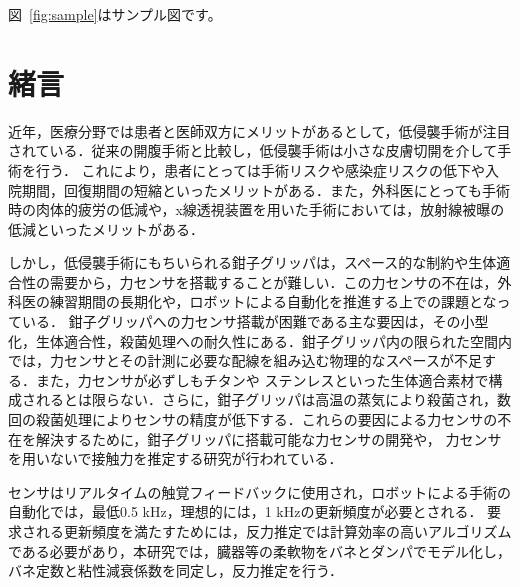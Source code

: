 \documentclass[a4paper]{jarticle}
\begin{document}
図~\ref{fig:sample}はサンプル図です。
\fi

\section{緒言}
近年，医療分野では患者と医師双方にメリットがあるとして，低侵襲手術が注目されている．従来の開腹手術と比較し，低侵襲手術は小さな皮膚切開を介して手術を行う．
これにより，患者にとっては手術リスクや感染症リスクの低下や入院期間，回復期間の短縮といったメリットがある．また，外科医にとっても手術時の肉体的疲労の低減や，x線透視装置を用いた手術においては，放射線被曝の低減といったメリットがある．

しかし，低侵襲手術にもちいられる鉗子グリッパは，スペース的な制約や生体適合性の需要から，力センサを搭載することが難しい．この力センサの不在は，外科医の練習期間の長期化や，ロボットによる自動化を推進する上での課題となっている．
鉗子グリッパへの力センサ搭載が困難である主な要因は，その小型化，生体適合性，殺菌処理への耐久性にある．鉗子グリッパ内の限られた空間内では，力センサとその計測に必要な配線を組み込む物理的なスペースが不足する．また，力センサが必ずしもチタンや
ステンレスといった生体適合素材で構成されるとは限らない．さらに，鉗子グリッパは高温の蒸気により殺菌され，数回の殺菌処理によりセンサの精度が低下する．これらの要因による力センサの不在を解決するために，鉗子グリッパに搭載可能な力センサの開発や，
力センサを用いないで接触力を推定する研究が行われている．%

センサはリアルタイムの触覚フィードバックに使用され，ロボットによる手術の自動化では，最低0.5 kHz，理想的には，1 kHzの更新頻度が必要とされる．
要求される更新頻度を満たすためには，反力推定では計算効率の高いアルゴリズムである必要があり，本研究では，臓器等の柔軟物をバネとダンパでモデル化し，バネ定数と粘性減衰係数を同定し，反力推定を行う．
\end{document}
